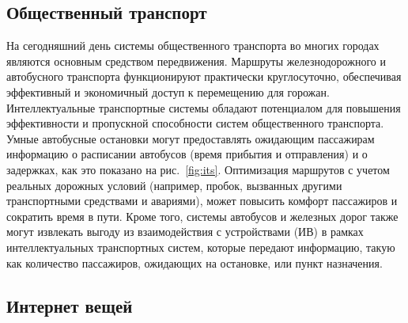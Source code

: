 \subsection{Общественный транспорт}

На сегодняшний день системы общественного транспорта во многих городах являются основным средством передвижения. Маршруты железнодорожного и автобусного транспорта функционируют практически круглосуточно, обеспечивая эффективный и экономичный доступ к перемещению для горожан. Интеллектуальные транспортные системы обладают потенциалом для повышения эффективности и пропускной способности систем общественного транспорта. Умные автобусные остановки могут предоставлять ожидающим пассажирам информацию о расписании автобусов (время прибытия и отправления) и о задержках, как это показано на рис.~\ref{fig:its}. Оптимизация маршрутов с учетом реальных дорожных условий (например, пробок, вызванных другими транспортными средствами и авариями), может повысить комфорт пассажиров и сократить время в пути. Кроме того, системы автобусов и железных дорог также могут извлекать выгоду из взаимодействия с устройствами  (ИВ) в рамках интеллектуальных транспортных систем, которые передают информацию, такую как количество пассажиров, ожидающих на остановке, или пункт назначения.

\subsection{Интернет вещей}

